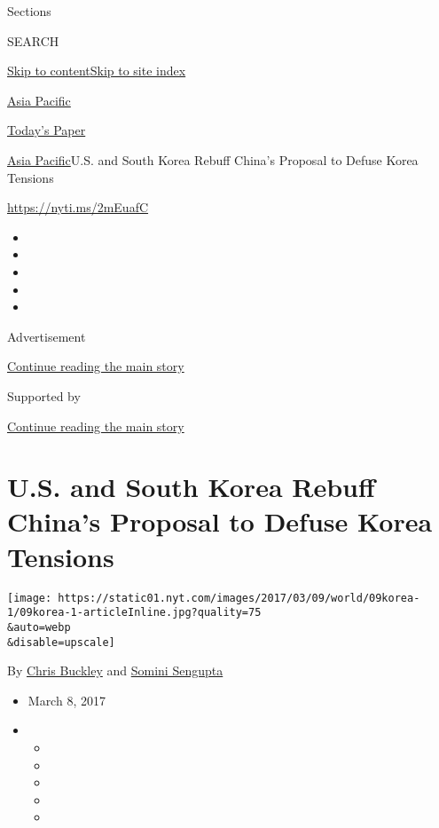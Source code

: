 Sections

SEARCH

\protect\hyperlink{site-content}{Skip to
content}\protect\hyperlink{site-index}{Skip to site index}

\href{https://www.nytimes.com/section/world/asia}{Asia Pacific}

\href{https://myaccount.nytimes.com/auth/login?response_type=cookie\&client_id=vi}{}

\href{https://www.nytimes.com/section/todayspaper}{Today's Paper}

\href{/section/world/asia}{Asia Pacific}\textbar{}U.S. and South Korea
Rebuff China's Proposal to Defuse Korea Tensions

\url{https://nyti.ms/2mEuafC}

\begin{itemize}
\item
\item
\item
\item
\item
\end{itemize}

Advertisement

\protect\hyperlink{after-top}{Continue reading the main story}

Supported by

\protect\hyperlink{after-sponsor}{Continue reading the main story}

\hypertarget{us-and-south-korea-rebuff-chinas-proposal-to-defuse-korea-tensions}{%
\section{U.S. and South Korea Rebuff China's Proposal to Defuse Korea
Tensions}\label{us-and-south-korea-rebuff-chinas-proposal-to-defuse-korea-tensions}}

\texttt{[image: https://static01.nyt.com/images/2017/03/09/world/09korea-1/09korea-1-articleInline.jpg?quality=75\\\&auto=webp\\\&disable=upscale]}

By \href{http://www.nytimes.com/by/chris-buckley}{Chris Buckley} and
\href{http://www.nytimes.com/by/somini-sengupta}{Somini Sengupta}

\begin{itemize}
\item
  March 8, 2017
\item
  \begin{itemize}
  \item
  \item
  \item
  \item
  \item
  \end{itemize}
\end{itemize}

